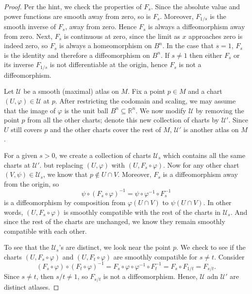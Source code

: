 \documentclass[12pt]{article}
\theoremstyle{definition}
\newcommand{\R}{\mathbb{R}}
\renewcommand{\phi}{\varphi}
\newcommand{\<}{\langle}
\renewcommand{\>}{\rangle}
\newcommand{\seq}{\subseteq}
\newcommand{\UU}{\mathcal{U}}
\begin{document}
\begin{proof}
    Per the hint, we check the properties of $F_s$.
    Since the absolute value and power functions are smooth away from zero, so is $F_s$.
    Moreover, $F_{1/s}$ is the smooth inverse of $F_s$, away from zero.
    Hence $F_s$ is always a diffeomorphism away from zero.
    Next, $F_s$ is continuous at zero, since the limit as $x$ approaches zero is indeed zero, so $F_s$ is always a homeomorphism on $B^n$.
    In the case that $s = 1$, $F_s$ is the identity and therefore a diffeomorphism on $B^n$.
    If $s \ne 1$ then either $F_s$ or its inverse $F_{1/s}$ is not differentiable at the origin, hence $F_s$ is not a diffeomorphism.

    Let $\UU$ be a smooth (maximal) atlas on $M$.
    Fix a point $p \in M$ and a chart $(U, \phi) \in \UU$ at $p$.
    After restricting the codomain and scaling, we may assume that the image of $\phi$ is the unit ball $B^n \seq \R^n$.
    We now modify $\UU$ by removing the point $p$ from all the other charts; denote this new collection of charts by $\UU'$.
    Since $U$ still covers $p$ and the other charts cover the rest of $M$, $\UU'$ is another atlas on $M$.

    For a given $s > 0$, we create a collection of charts $\UU_s$ which contains all the same charts at $\UU'$. but replacing $(U, \phi)$ with $(U, F_s \circ \phi)$.
    Now for any other chart $(V, \psi) \in \UU_s$, we know that $p \notin U \cap V$.
    Moreover, $F_s$ is a diffeomorphism away from the origin, so
    \[
        \psi \circ (F_s \circ \phi)^{-1}
            = \psi \circ \phi^{-1} \circ F_s^{-1}
    \]
    is a diffeomorphism by composition from $\phi(U \cap V)$ to $\psi(U \cap V)$.
    In other words, $(U, F_s \circ \phi)$ is smoothly compatible with the rest of the charts in $\UU_s$.
    And since the rest of the charts are unchanged, we know they remain smoothly compatible with each other.

    To see that the $\UU_s$'s are distinct, we look near the point $p$.
    We check to see if the charts $(U, F_s \circ \phi)$ and $(U, F_t \circ \phi)$ are smoothly compatible for $s \ne t$.
    Consider
    \[
        (F_s \circ \phi) \circ (F_t \circ \phi)^{-1}
            = F_s \circ \phi \circ \phi^{-1} \circ F_t^{-1}
            = F_s \circ F_{1/t}
            = F_{s/t}.
    \]
    Since $s \neq t$, then $s/t \ne 1$, so $F_{s/t}$ is not a diffeomorphism.
    Hence, $\UU$ adn $\UU'$ are distinct atlases.
\end{proof}
\end{document}
